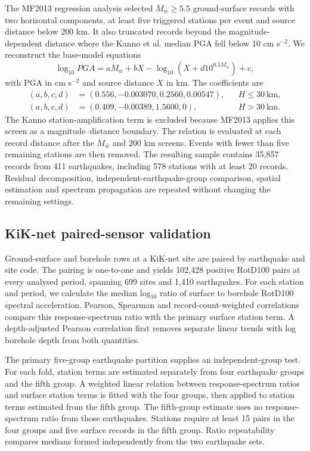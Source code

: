 \documentclass[10pt]{article}
\begin{document}
The MF2013 regression analysis selected $M_w\geq5.5$ ground-surface records with two horizontal components, at least five triggered stations per event and source distance below 200 km\cite{morikawa2013}. It also truncated records beyond the magnitude-dependent distance where the Kanno et al. median PGA fell below 10 cm s$^{-2}$\cite{kanno2006}. We reconstruct the base-model equations
\begin{equation}
\log_{10} PGA=aM_w+bX-\log_{10}\left(X+d10^{0.5M_w}\right)+c,
\end{equation}
with PGA in cm s$^{-2}$ and source distance $X$ in km. The coefficients are
\begin{align*}
(a,b,c,d)&=(0.556,-0.003070,0.2560,0.00547), && H\leq30~\mathrm{km},\\
(a,b,c,d)&=(0.409,-0.00389,1.5600,0), && H>30~\mathrm{km}.
\end{align*}
The Kanno station-amplification term is excluded because MF2013 applies this screen as a magnitude--distance boundary. The relation is evaluated at each record distance after the $M_w$ and 200 km screens. Events with fewer than five remaining stations are then removed. The resulting sample contains 35,857 records from 411 earthquakes, including 578 stations with at least 20 records. Residual decomposition, independent-earthquake-group comparison, spatial estimation and spectrum propagation are repeated without changing the remaining settings.

\subsection*{KiK-net paired-sensor validation}

Ground-surface and borehole rows at a KiK-net site are paired by earthquake and site code. The pairing is one-to-one and yields 102,428 positive RotD100 pairs at every analysed period, spanning 699 sites and 1,410 earthquakes. For each station and period, we calculate the median log$_{10}$ ratio of surface to borehole RotD100 spectral acceleration. Pearson, Spearman and record-count-weighted correlations compare this response-spectrum ratio with the primary surface station term. A depth-adjusted Pearson correlation first removes separate linear trends with log borehole depth from both quantities.

The primary five-group earthquake partition supplies an independent-group test. For each fold, station terms are estimated separately from four earthquake groups and the fifth group. A weighted linear relation between response-spectrum ratios and surface station terms is fitted with the four groups, then applied to station terms estimated from the fifth group. The fifth-group estimate uses no response-spectrum ratio from those earthquakes. Stations require at least 15 pairs in the four groups and five surface records in the fifth group. Ratio repeatability compares medians formed independently from the two earthquake sets.
\end{document}
